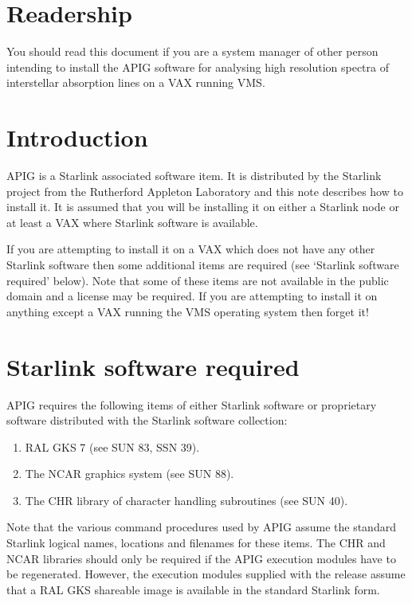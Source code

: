 \section{Readership}

You should read this document if you are a system manager of other
person intending to install the APIG software for analysing high
resolution spectra of interstellar absorption lines on a VAX running
VMS.

\section{Introduction}

APIG is a Starlink associated software item. It is distributed by the
Starlink project from the Rutherford Appleton Laboratory and this note
describes how to install it. It is assumed that you will be installing
it on either a Starlink node or at least a VAX where Starlink software
is available.

If you are attempting to install it on a VAX which does not have any
other Starlink software then some additional items are required (see
`Starlink software required' below). Note that some of these items are
not available in the public domain and a license may be required. If you
are attempting to install it on anything except a VAX running the VMS
operating system then forget it!

\section{Starlink software required}

APIG requires the following items of either Starlink software or
proprietary software distributed with the Starlink software collection:

\begin{enumerate}

  \item RAL GKS 7 (see SUN 83, SSN 39).

  \item The NCAR graphics system (see SUN 88).

  \item The CHR library of character handling subroutines (see SUN 40).

\end{enumerate}

Note that the various command procedures used by APIG assume the
standard Starlink logical names, locations and filenames for these
items. The CHR and NCAR libraries should only be required if the APIG
execution modules have to be regenerated. However, the execution
modules supplied with the release assume that a RAL GKS shareable
image is available in the standard Starlink form.

